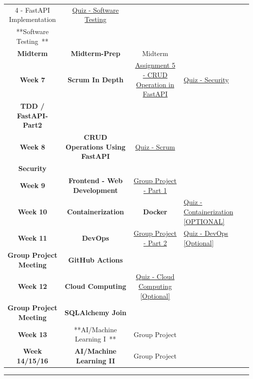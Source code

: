 \documentclass[
]{article}
\begin{document}
\begin{longtable}[]{@{}cccll@{}}
{4 - FastAPI Implementation} &
\href{https://instructure.charlotte.edu/courses/264138/assignments/2981502?wrap=1}{Quiz
- Software Testing} & \\
**Software Testing~** & & & & \\
\textbf{Midterm} & \textbf{Midterm-Prep} & Midterm & & \\
\textbf{Week 7} & \textbf{Scrum In Depth} &
\href{https://instructure.charlotte.edu/courses/264138/assignments/2981554?wrap=1}{Assignment
5 - CRUD Operation in FastAPI} &
\href{https://instructure.charlotte.edu/courses/264138/quizzes/636022?wrap=1}{Quiz
- Security} & \\
\textbf{TDD / FastAPI- Part2} & & & & \\
\textbf{Week 8} & \textbf{CRUD Operations Using FastAPI} &
\href{https://instructure.charlotte.edu/courses/264138/quizzes/636043?wrap=1}{Quiz
- Scrum} & & \\
\textbf{Security} & & & & \\
\textbf{Week 9} & \textbf{Frontend - Web Development} &
\href{https://instructure.charlotte.edu/courses/$CANVAS_OBJECT_REFERENCE$/assignments/g53104bb09d2c7e6e864e6cfc9c4d538b?wrap=1}{Group
Project - Part 1} & & \\
\textbf{Week 10} & \textbf{Containerization} & \textbf{Docker} &
\href{https://instructure.charlotte.edu/courses/264138/quizzes/636027?wrap=1}{Quiz
- Containerization {[}OPTIONAL{]}} & \\
\textbf{Week 11} & \textbf{DevOps} &
\href{https://instructure.charlotte.edu/courses/$CANVAS_OBJECT_REFERENCE$/assignments/ge95cf156bf9319553487d7b054086722?wrap=1}{Group
Project - Part 2} &
\href{https://instructure.charlotte.edu/courses/264138/quizzes/636032?wrap=1}{Quiz
- DevOps {[}Optional{]}} & \\
\textbf{Group Project Meeting} & \textbf{GitHub Actions} & & & \\
\textbf{Week 12} & \textbf{Cloud Computing} &
\href{https://instructure.charlotte.edu/courses/264138/quizzes/636063?wrap=1}{Quiz
- Cloud Computing {[}Optional{]}} & ~ & \\
\textbf{Group Project Meeting} & \textbf{SQLAlchemy Join} & & & \\
\textbf{Week 13} & **AI/Machine Learning I~** & Group Project & & \\
\textbf{Week 14/15/16} & \textbf{AI/Machine Learning II} & Group Project
& & \\
\end{longtable}

\begin{center}\rule{0.5\linewidth}{0.5pt}\end{center}
\end{document}
